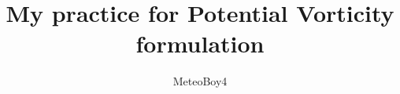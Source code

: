 \documentclass[12pt]{article}
\begin{document}
\title{My practice for Potential Vorticity formulation}
\author{MeteoBoy4}
\maketitle
\end{document}
